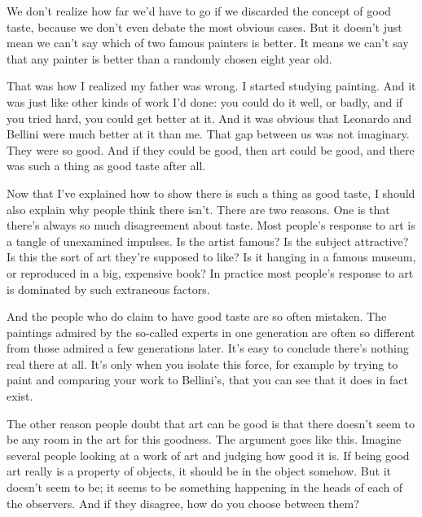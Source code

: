 We don't
                  realize how far we'd have to go if we discarded the concept of
                  good taste, because we don't even debate the most obvious
                  cases. But it doesn't just mean we can't say which of two
                  famous painters is better. It means we can't say that any
                  painter is better than a randomly chosen eight year old.

That
                  was how I realized my father was wrong. I started studying
                  painting. And it was just like other kinds of work I'd done:
                  you could do it well, or badly, and if you tried hard, you
                  could get better at it. And it was obvious that Leonardo and
                  Bellini were much better at it than me. That gap between us
                  was not imaginary. They were so good. And if they could be
                  good, then art could be good, and there was such a thing as
                  good taste after all.

Now that I've explained how
                  to show there is such a thing as good taste, I should also
                  explain why people think there isn't. There are two reasons.
                  One is that there's always so much disagreement about taste.
                  Most people's response to art is a tangle of unexamined
                  impulses. Is the artist famous? Is the subject attractive? Is
                  this the sort of art they're supposed to like? Is it hanging
                  in a famous museum, or reproduced in a big, expensive book? In
                  practice most people's response to art is dominated by such
                  extraneous factors.

And the people who do claim to
                  have good taste are so often mistaken. The paintings admired
                  by the so-called experts in one generation are often so
                  different from those admired a few generations later. It's
                  easy to conclude there's nothing real there at all. It's only
                  when you isolate this force, for example by trying to paint
                  and comparing your work to Bellini's, that you can see that it
                  does in fact exist.

The other reason people doubt
                  that art can be good is that there doesn't seem to be any room
                  in the art for this goodness. The argument goes like this.
                  Imagine several people looking at a work of art and judging
                  how good it is. If being good art really is a property of
                  objects, it should be in the object somehow. But it doesn't
                  seem to be; it seems to be something happening in the heads of
                  each of the observers. And if they disagree, how do you choose
                  between them?

